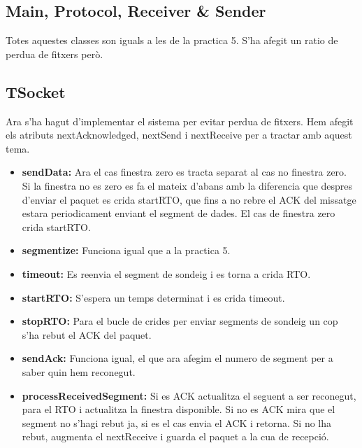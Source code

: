 \documentclass[12pt, a4papre]{article}
\begin{document}
	\subsection{Main, Protocol, Receiver \& Sender}
	
	Totes aquestes classes son iguals a les de la practica 5. S'ha afegit un ratio de perdua de fitxers però.
	
	\subsection{TSocket}
	
	Ara s'ha hagut d'implementar el sistema per evitar perdua de fitxers. Hem afegit els atributs nextAcknowledged, nextSend i nextReceive per a tractar amb aquest tema.
	
	\begin{itemize}
		\item \textbf{sendData:}  Ara el cas finestra zero es tracta separat al cas no finestra zero. Si la finestra no es zero es fa el mateix d'abans amb la diferencia que despres d'enviar el paquet es crida startRTO, que fins a no rebre el ACK del missatge estara periodicament enviant el segment de dades. El cas de finestra zero crida startRTO.
		\item \textbf{segmentize:} Funciona igual que a la practica 5.
		\item \textbf{timeout:} Es reenvia el segment de sondeig i es torna a crida RTO.
		\item \textbf{startRTO:} S'espera un temps determinat i es crida timeout.
		\item \textbf{stopRTO:} Para el bucle de crides per enviar segments de sondeig un cop s'ha rebut el ACK del paquet.
		\item \textbf{sendAck:} Funciona igual, el que ara afegim el numero de segment per a saber quin hem reconegut.
		\item \textbf{processReceivedSegment:} Si es ACK actualitza el seguent a ser reconegut, para el RTO i actualitza la finestra disponible. Si no es ACK mira que el segment no s'hagi rebut ja, si es el cas envia el ACK i retorna. Si no lha rebut, augmenta el nextReceive i guarda el paquet a la cua de recepció.
	\end{itemize}
	
	
\end{document}
